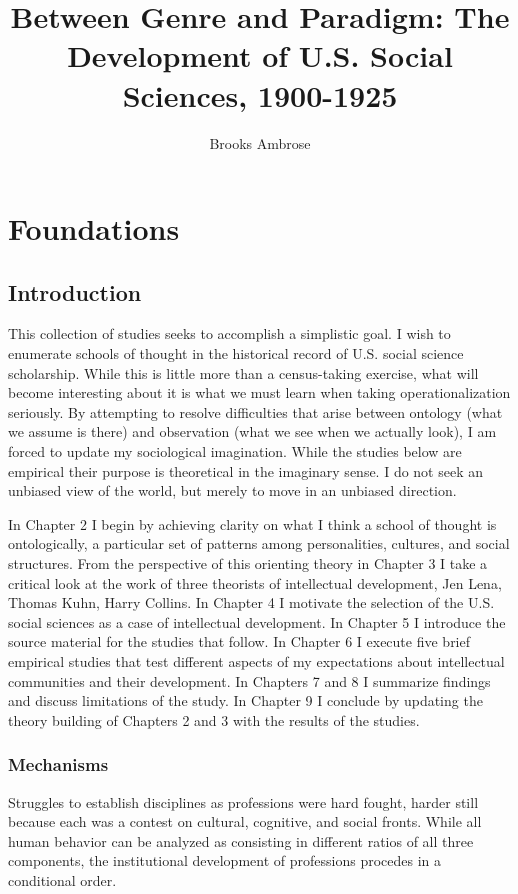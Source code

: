 \documentclass [PhD] {uclathes}
\title          {Between Genre and Paradigm: The Development of U.S. Social Sciences, 1900-1925}
\author         {Brooks Ambrose}
\begin{document}
\makeintropages

\chapter{Foundations}
\section{Introduction}\label{introduction}

This collection of studies seeks to accomplish a simplistic goal. I wish
to enumerate schools of thought in the historical record of U.S. social
science scholarship. While this is little more than a census-taking
exercise, what will become interesting about it is what we must learn
when taking operationalization seriously. By attempting to resolve
difficulties that arise between ontology (what we assume is there) and
observation (what we see when we actually look), I am forced to update
my sociological imagination. While the studies below are empirical their
purpose is theoretical in the imaginary sense. I do not seek an unbiased
view of the world, but merely to move in an unbiased direction.

In Chapter 2 I begin by achieving clarity on what I think a school of
thought is ontologically, a particular set of patterns among
personalities, cultures, and social structures. From the perspective of
this orienting theory in Chapter 3 I take a critical look at the work of
three theorists of intellectual development, Jen Lena, Thomas Kuhn,
Harry Collins. In Chapter 4 I motivate the selection of the U.S. social
sciences as a case of intellectual development. In Chapter 5 I introduce
the source material for the studies that follow. In Chapter 6 I execute
five brief empirical studies that test different aspects of my
expectations about intellectual communities and their development. In
Chapters 7 and 8 I summarize findings and discuss limitations of the
study. In Chapter 9 I conclude by updating the theory building of
Chapters 2 and 3 with the results of the studies.

\subsection{Mechanisms}\label{mechanisms}

Struggles to establish disciplines as professions were hard fought,
harder still because each was a contest on cultural, cognitive, and
social fronts. While all human behavior can be analyzed as consisting in
different ratios of all three components, the institutional development
of professions procedes in a conditional order.
\end{document}
